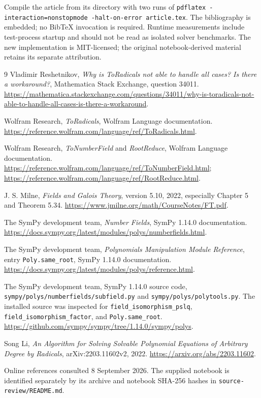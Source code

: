 \documentclass[11pt,letterpaper]{article}
\newcommand{\code}[1]{\texttt{#1}}
\theoremstyle{definition}\newtheorem{definition}[theorem]{Definition}
\theoremstyle{remark}\newtheorem{remark}[theorem]{Remark}
\begin{document}
Compile the article from its directory with two runs of
\code{pdflatex -interaction=nonstopmode -halt-on-error article.tex}.
The bibliography is embedded; no BibTeX invocation is required. Runtime
measurements include test-process startup and should not be read as isolated
solver benchmarks. The new implementation is MIT-licensed; the original
notebook-derived material retains its separate attribution.

\begingroup\raggedright
\begin{thebibliography}{9}
Vladimir Reshetnikov, \emph{Why is ToRadicals not able to handle all cases?
Is there a workaround?}, Mathematica Stack Exchange, question 34011.
\url{https://mathematica.stackexchange.com/questions/34011/why-is-toradicals-not-able-to-handle-all-cases-is-there-a-workaround}.

Wolfram Research, \emph{ToRadicals}, Wolfram Language documentation.
\url{https://reference.wolfram.com/language/ref/ToRadicals.html}.

Wolfram Research, \emph{ToNumberField} and \emph{RootReduce}, Wolfram Language documentation.
\url{https://reference.wolfram.com/language/ref/ToNumberField.html};
\url{https://reference.wolfram.com/language/ref/RootReduce.html}.

J. S. Milne, \emph{Fields and Galois Theory}, version 5.10, 2022,
especially Chapter 5 and Theorem 5.34.
\url{https://www.jmilne.org/math/CourseNotes/FT.pdf}.

The SymPy development team, \emph{Number Fields}, SymPy 1.14.0 documentation.
\url{https://docs.sympy.org/latest/modules/polys/numberfields.html}.

The SymPy development team, \emph{Polynomials Manipulation Module Reference},
entry \code{Poly.same\_root}, SymPy 1.14.0 documentation.
\url{https://docs.sympy.org/latest/modules/polys/reference.html}.

The SymPy development team, SymPy 1.14.0 source code,
\code{sympy/polys/numberfields/subfield.py} and
\code{sympy/polys/polytools.py}. The installed source was inspected for
\code{field\_isomorphism\_pslq}, \code{field\_isomorphism\_factor},
and \code{Poly.same\_root}.
\url{https://github.com/sympy/sympy/tree/1.14.0/sympy/polys}.

Song Li, \emph{An Algorithm for Solving Solvable Polynomial Equations of Arbitrary Degree by Radicals}, arXiv:2203.11602v2, 2022.
\url{https://arxiv.org/abs/2203.11602}.

\end{thebibliography}
\endgroup
\small Online references consulted 8 September 2026. The supplied notebook is
identified separately by its archive and notebook SHA-256 hashes in
\code{source-review/README.md}.
\end{document}
